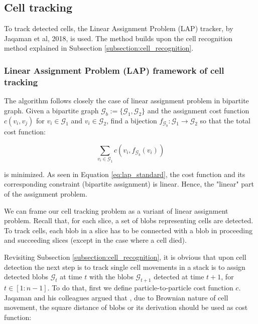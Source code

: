 \documentclass[pdftex,12pt,a4paper]{report}
\begin{document}
\subsection{Cell tracking}
\label{subsection:cell_tracking}


To track detected cells, the Linear Assignment Problem (LAP) tracker, by Jaqaman et al, 2018, is used. The method builds upon the cell recognition method explained in Subsection \ref{subsection:cell_recognition}.

\subsubsection*{Linear Assignment Problem (LAP) framework of cell tracking}

The algorithm follows closely the case of linear assignment problem in bipartite graph. Given a bipartite graph $\mathcal{G}_b:= \{\mathcal{G}_1, \mathcal{G}_2\}$ and the assignment cost function 
$c(v_i, v_j)$ for $v_i \in \mathcal{G}_1$ and $v_i \in \mathcal{G}_2$, find a bijection $f_{\mathcal{G}_b} : \mathcal{G}_1 \rightarrow \mathcal{G}_2$ so that the total cost function:

\begin{equation}
\sum_{v_i \in \mathcal{G}_1} c(v_i, f_{\mathcal{G}_b}(v_i))
\label{eq:lap_standard}
\end{equation}


is minimized. As seen in Equation \ref{eq:lap_standard}, the cost function and its corresponding constraint (bipartite assignment) is linear. Hence, the "linear" part of the assignment problem.

We can frame our cell tracking problem as a variant of linear assignment problem. Recall that, for each slice, a set of blobs representing cells are detected. To track cells, each blob in a slice has to be connected with a blob in proceeding and succeeding slices (except in the case where a cell died).

Revisiting Subsection \ref{subsection:cell_recognition}, it is obvious that upon cell detection the next step is to track single cell movements in a stack is to assign detected blobs $\mathcal{G}_t$ at time $t$ with the blobs $\mathcal{G}_{t + 1}$ detected at time $t + 1$,  for $t \in [1:n - 1]$. To do that, first we define particle-to-particle cost function $c$. Jaqaman and his colleagues argued that \cite{jaqaman2008robust}, due to Brownian nature of cell movement, the square distance of blobs or its derivation should be used as cost function: 
\end{document}

